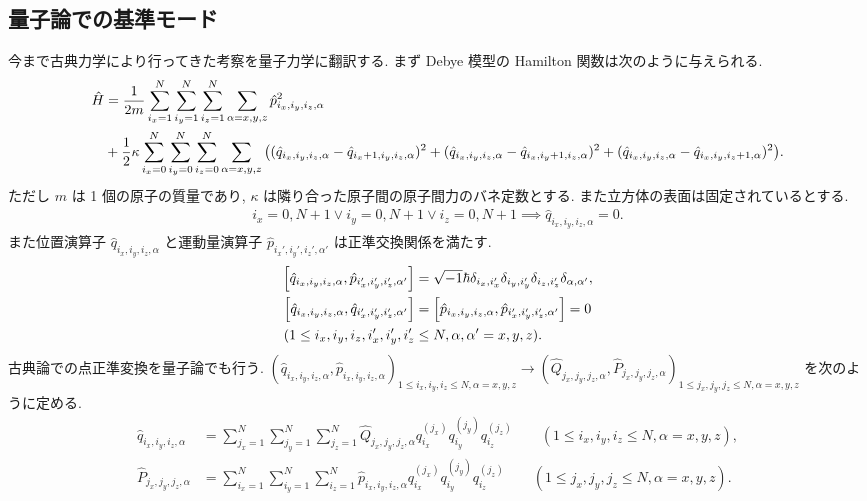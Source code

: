 \documentclass[uplatex,dvipdfmx,a4paper,11pt]{jlreq}
\theoremstyle{definition}
\begin{document}
\subsection{量子論での基準モード}
今まで古典力学により行ってきた考察を量子力学に翻訳する. まず Debye 模型の Hamilton 関数は次のように与えられる.
\begin{align}
  \hat{H} & = \frac{1}{2m}\sum_{i_x=1}^{N}\sum_{i_y=1}^{N}\sum_{i_z=1}^{N}\sum_{\alpha=x,y,z}\hat{p}_{i_x,i_y,i_z,\alpha}^2                                                                                                                                                                                        \\
          & + \frac{1}{2}\kappa\sum_{i_x=0}^{N}\sum_{i_y=0}^{N}\sum_{i_z=0}^{N}\sum_{\alpha=x,y,z}\qty((\hat{q}_{i_x,i_y,i_z,\alpha} - \hat{q}_{i_x+1,i_y,i_z,\alpha})^2 + (\hat{q}_{i_x,i_y,i_z,\alpha} - \hat{q}_{i_x,i_y+1,i_z,\alpha})^2 + (\hat{q}_{i_x,i_y,i_z,\alpha} - \hat{q}_{i_x,i_y,i_z+1,\alpha})^2).
\end{align}
ただし $m$ は 1 個の原子の質量であり, $\kappa$ は隣り合った原子間の原子間力のバネ定数とする. また立方体の表面は固定されているとする.
\begin{align}
  i_x = 0, N+1\lor i_y = 0, N+1\lor i_z = 0, N+1 \implies \hat{q}_{i_x,i_y,i_z,\alpha} = 0.
\end{align}
また位置演算子 $\hat{q}_{i_x,i_y,i_z,\alpha}$ と運動量演算子 $\hat{p}_{i_x',i_y',i_z',\alpha'}$ は正準交換関係を満たす.
\begin{align}
  \qty[\hat{q}_{i_x,i_y,i_z,\alpha}, \hat{p}_{i_x',i_y',i_z',\alpha'}] & = \sqrt{-1}\hbar\delta_{i_x,i_x'}\delta_{i_y,i_y'}\delta_{i_z,i_z'}\delta_{\alpha,\alpha'}, \\
  \qty[\hat{q}_{i_x,i_y,i_z,\alpha}, \hat{q}_{i_x',i_y',i_z',\alpha'}] & = \qty[\hat{p}_{i_x,i_y,i_z,\alpha}, \hat{p}_{i_x',i_y',i_z',\alpha'}] = 0                  \\
  (1\leq i_x,i_y,i_z,i_x',i_y',i_z'                                    & \leq N, \alpha,\alpha' = x,y,z).
\end{align}
古典論での点正準変換を量子論でも行う. $(\hat{q}_{i_x,i_y,i_z,\alpha}, \hat{p}_{i_x,i_y,i_z,\alpha})_{1\leq i_x,i_y,i_z\leq N,\alpha=x,y,z}\to(\hat{Q}_{j_x,j_y,j_z,\alpha}, \hat{P}_{j_x,j_y,j_z,\alpha})_{1\leq j_x,j_y,j_z\leq N,\alpha=x,y,z}$ を次のように定める.
\begin{align}
  \hat{q}_{i_x,i_y,i_z,\alpha} & = \sum_{j_x=1}^{N}\sum_{j_y=1}^{N}\sum_{j_z=1}^{N}\hat{Q}_{j_x,j_y,j_z,\alpha}q_{i_x}^{(j_x)}q_{i_y}^{(j_y)}q_{i_z}^{(j_z)} \qquad (1\leq i_x,i_y,i_z \leq N, \alpha = x,y,z), \\
  \hat{P}_{j_x,j_y,j_z,\alpha} & = \sum_{i_x=1}^{N}\sum_{i_y=1}^{N}\sum_{i_z=1}^{N}\hat{p}_{i_x,i_y,i_z,\alpha}q_{i_x}^{(j_x)}q_{i_y}^{(j_y)}q_{i_z}^{(j_z)} \qquad (1\leq j_x,j_y,j_z \leq N, \alpha = x,y,z).
\end{align}
\end{document}
